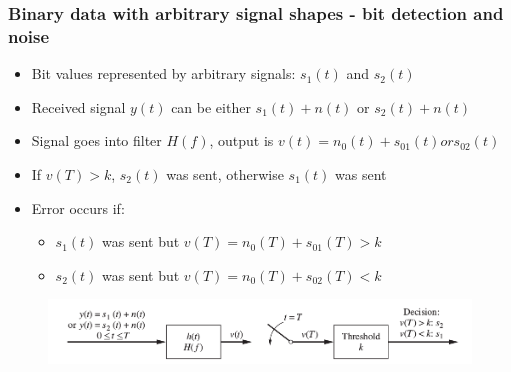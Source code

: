 \documentclass{beamer}
\begin{document}
	\begin{frame}
		\frametitle{Binary data with arbitrary signal shapes - bit detection and noise}
		\begin{itemize}
			\item Bit values represented by arbitrary signals: $ s_1(t) $ and $ s_2(t) $
			\item Received signal $ y(t) $ can be either $ s_1(t)+n(t) $ or $ s_2(t)+n(t) $
			\item Signal goes into filter $ H(f) $, output is $ v(t) = n_0(t) + s_{01}(t) or s_{02}(t) $
			\item If $v(T) > k$, $ s_2(t) $ was sent, otherwise $ s_1(t) $ was sent
			\item Error occurs if:
			\begin{itemize}
				\item $s_1(t)$ was sent but $ v(T) = n_0(T) + s_{01}(T) > k $
				\item $s_2(t)$ was sent but $ v(T) = n_0(T) + s_{02}(T) < k $
			\end{itemize}
		\end{itemize}
		\begin{figure}
			\includegraphics[width=\textwidth,keepaspectratio,center]{recvr.png}
		\end{figure}
	\end{frame}
\end{document}

